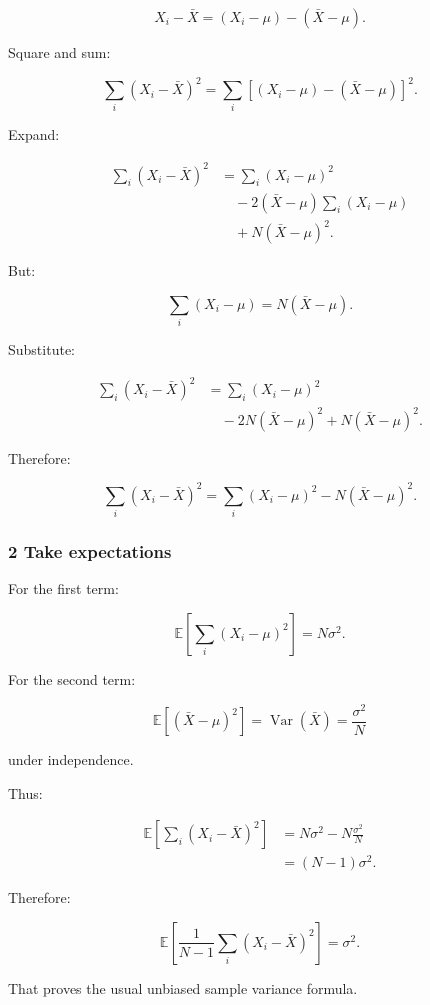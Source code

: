 \[
 X_i-\bar X = (X_i-\mu)-(\bar X-\mu).
\]

Square and sum:

\[
 \sum_i(X_i-\bar X)^2 = \sum_i[ (X_i-\mu)-(\bar X-\mu) ]^2.
\]

Expand:

\[
 \begin{aligned} \sum_i(X_i-\bar X)^2 &= \sum_i(X_i-\mu)^2\\ &\quad-2(\bar X-\mu)\sum_i(X_i-\mu)\\ &\quad+N(\bar X-\mu)^2. \end{aligned}
\]

But:

\[
 \sum_i(X_i-\mu)=N(\bar X-\mu).
\]

Substitute:

\[
 \begin{aligned} \sum_i(X_i-\bar X)^2 &= \sum_i(X_i-\mu)^2\\ &\quad-2N(\bar X-\mu)^2 +N(\bar X-\mu)^2. \end{aligned}
\]

Therefore:

\[
 \boxed{ \sum_i(X_i-\bar X)^2 = \sum_i(X_i-\mu)^2 - N(\bar X-\mu)^2 }.
\]

\subsubsection{2 Take expectations}\label{02-foundations-ii-ch030-take-expectations}

\hypertarget{02-foundations-ii-ch030-take-expectations}{}

For the first term:

\[
 \mathbb E\left[ \sum_i(X_i-\mu)^2 \right] =N\sigma^2.
\]

For the second term:

\[
 \mathbb E[(\bar X-\mu)^2] = \operatorname{Var}(\bar X) = \frac{\sigma^2}{N}
\]

under independence.

Thus:

\[
 \begin{aligned} \mathbb E\left[ \sum_i(X_i-\bar X)^2 \right] &= N\sigma^2- N\frac{\sigma^2}{N}\\ &=(N-1)\sigma^2. \end{aligned}
\]

Therefore:

\[
 \boxed{ \mathbb E\left[ \frac1{N-1} \sum_i(X_i-\bar X)^2 \right] = \sigma^2 }.
\]

That proves the usual unbiased sample variance formula.

